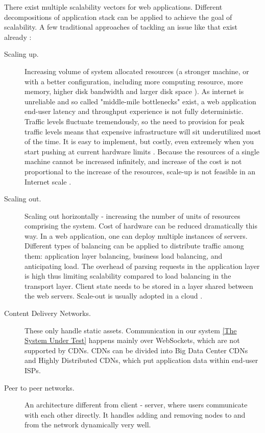 \documentclass{uvamscse}
\begin{document}
There exist multiple scalability vectors for web applications. Different decompositions of application stack can be applied to achieve the goal of scalability. A few traditional approaches of tackling an issue like that exist already \cite{Akamai}:
\begin{description}
  \item[Scaling up.]
  Increasing volume of system allocated resources (a stronger machine, or with a better configuration, including more computing resource, more memory, higher disk bandwidth and larger disk space \cite{WeiTek}). As internet is unreliable and so called "middle-mile bottlenecks" exist, a web application end-user latency and throughput experience is not fully deterministic. Traffic levels fluctuate tremendously, so the need to provision for peak traffic levels means that expensive infrastructure will sit underutilized most of the time. It is easy to implement, but costly, even extremely when you start pushing at current hardware limits \cite{Qvef}. Because the resources of a single machine cannot be increased infinitely, and increase of the cost is not proportional to the increase of the resources, scale-up is not feasible in an Internet scale \cite{WeiTek}.
  \item[Scaling out.]
  Scaling out horizontally - increasing the number of units of resources comprising the system. Cost of hardware can be reduced dramatically this way. In a web application, one can deploy multiple instances of servers. Different types of balancing can be applied to distribute traffic among them: application layer balancing, business load balancing, and anticipating load. The overhead of parsing requests in the application layer is high thus limiting scalability compared to load balancing in the transport layer. Client state needs to be stored in a layer shared between the web servers.\cite{Qvef}  Scale-out is usually adopted in a cloud \cite{WeiTek}.
  \item[Content Delivery Networks.]
  These only handle static assets. Communication in our system \ref{The System Under Test} happens mainly over WebSockets, which are not supported by CDNs. CDNs can be divided into Big Data Center CDNs and Highly Distributed CDNs, which put application data within end-user ISPs.\cite{Akamai}
  \item[Peer to peer networks.]
  An architecture different from client - server, where users communicate with each other directly. It handles adding and removing nodes to and from the network dynamically very well.
\end{description}
\end{document}
